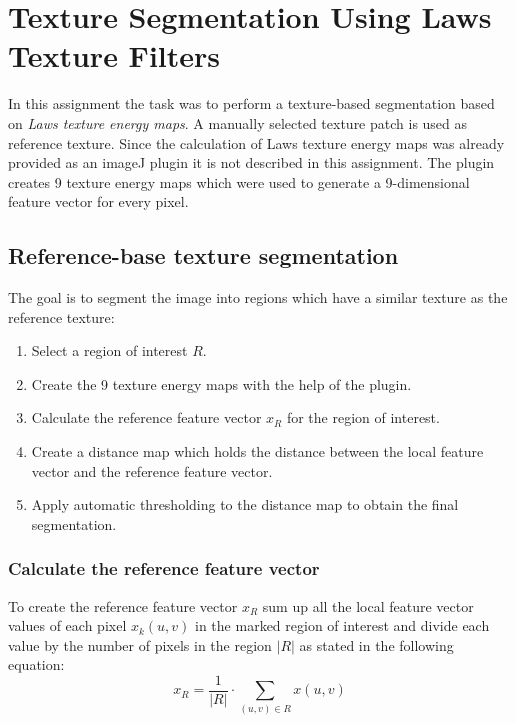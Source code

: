 \chapter{Texture Segmentation Using Laws Texture Filters}

In this assignment the task was to perform a texture-based segmentation based on \textit{Laws texture energy maps}\cite{Laws1980}. A manually selected texture patch is used as reference texture. Since the calculation of Laws texture energy maps was already provided as an imageJ plugin it is not described in this assignment. The plugin creates 9 texture energy maps which were used to generate a 9-dimensional feature vector for every pixel. 

\section{Reference-base texture segmentation}

The goal is to segment the image into regions which have a similar texture as the reference texture:

\begin{enumerate}
	\item Select a region of interest $R$.
	\item Create the 9 texture energy maps with the help of the plugin.
	\item Calculate the reference feature vector $x_R$ for the region of interest.
	\item Create a distance map which holds the distance between the local feature vector and the reference feature vector.
	\item Apply automatic thresholding to the distance map to obtain the final segmentation.
\end{enumerate}

\subsection{Calculate the reference feature vector}
To create the reference feature vector $x_R$ sum up all the local feature vector values of each pixel $x_k(u,v)$ in the marked region of interest and divide each value by the number of pixels in the region $|R|$ as stated in the following equation:
\begin{equation}
	x_R = \frac{1}{|R|} \cdot \sum_{(u,v)\in R} x(u, v)
\end{equation}

